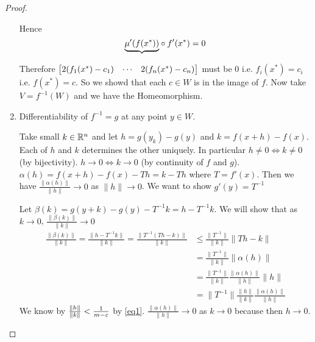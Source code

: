 \begin{proof}
\begin{enumerate}[label=\bfseries\tiny\protect\circled{\small\arabic*}]
\begin{center}
\end{center}
Hence $$\EqM{c1}{\underbrace{\mu'(f(x^*))}}\circ f'(x^*)=0$$

\vspace{1.5cm}

Therefore $\left[\begin{matrix}2(f_1(x^*)-c_1) & \cdots & 2(f_n(x^*)-c_n)\end{matrix}\right]$ must be 0 i.e. $f_i(x^*)=c_i$ i.e. $f(x^*)=c$. So we showd that each $c\in W$ is in the image of $f$. Now take $V=f^{-1}(W)$ and we have the Homeomorphism.


\item Differentiability of $f^{-1}=g$ at any point $y\in W$.

\begin{center}
\end{center}

Take small $k\in\mathbb{R}^n$ and let $h=g(y_k)-g(y)$ and $k=f(x+h)-f(x)$. Each of $h$ and $k$ determines the other uniquely. In particular $h\neq 0\iff k\neq 0$ (by bijectivity). $h\to 0 \iff k\to 0$ (by continuity of $f$ and $g$). $\alpha(h)=f(x+h)-f(x)-Th=k-Th$ where $T=f'(x)$. Then we have $\frac{\|\alpha(h)\|}{\|h\|}\to 0$ as $\|h\|\to 0$. We want to show $g'(y)=T^{-1}$

Let $\beta(k)=g(y+k)-g(y)-T^{-1}k=h-T^{-1}k$. We will show that as $k\to 0$, $\frac{\|\beta(k)\|}{\|k\|}\to 0$\begin{align*}
	\frac{\|\beta(k)\|}{\|k\|} = \frac{\|h-T^{-1}k\|}{\|k\|}= \frac{\|T^{-1}(Th-k)\|}{\|k\|} & \leq \frac{\|T^{-1}\|}{\|k\|}\|Th-k\|\\
	& = \frac{\|T^{-1}\|}{\|k\|} \|\alpha(h)\|\\
	& = \frac{\|T^{-1}\|}{\|k\|} \frac{\|\alpha(h)\|}{\|h\|}\|h\|\\
	& = \|T^{-1}\|\frac{\|h\|}{\|k\|}  \frac{\|\alpha(h)\|}{\|h\|}
\end{align*}
We know by $\frac{\|h\|}{\|k\|} <\frac{1}{m-\varepsilon}$ by  \eqref{eq1}. $\frac{\|\alpha(h)\|}{\|h\|}\to 0$ as $k\to 0$ because then $h\to 0$.
\end{enumerate}
\end{proof}
